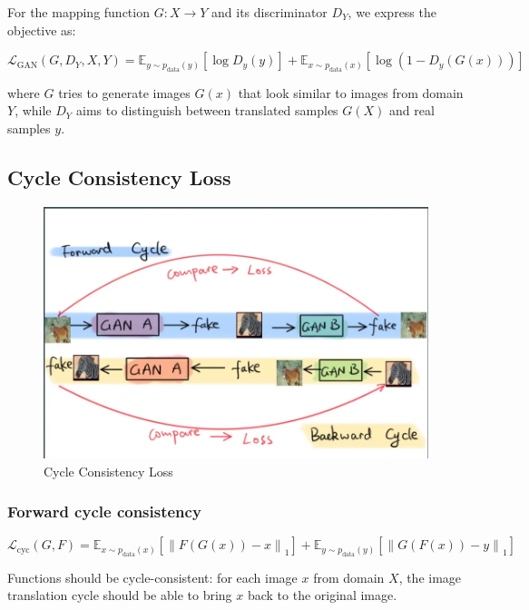 \documentclass[
]{article}
\begin{document}
For the mapping function \(G:X \rightarrow Y\) and its discriminator \(D_Y\),
we express the objective as:

\[\mathcal{L}_{\text{GAN}}(G,D_Y,X,Y)=\mathbb{E}_{y\sim p_{\text{data}}(y)}[\log{D_y(y)}]+\mathbb{E}_{x\sim p_{\text{data}}(x)}[\log{(1-D_y(G(x)))}]\]

where \(G\) tries to generate images \(G(x)\) that look similar to
images from domain \(Y\), while \(D_Y\) aims to distinguish between
translated samples \(G(X)\) and real samples \(y\).

\hypertarget{cycle-consistency-loss}{%
\subsection{Cycle Consistency Loss}\label{cycle-consistency-loss}}

\begin{figure}
\centering
\includegraphics{./assets/cycle_consistency_loss.png}
\caption{Cycle Consistency Loss}
\end{figure}

\hypertarget{forward-cycle-consistency}{%
\subsubsection{Forward cycle
consistency}\label{forward-cycle-consistency}}

\[\mathcal{L}_{\text{cyc}}(G,F)=\mathbb{E}_{x\sim p_{\text{data}}(x)}[\left\|F(G(x))-x\right\|_1]+\mathbb{E}_{y\sim p_{\text{data}}(y)}[\left\|G(F(x))-y\right\|_1]\]

Functions should be cycle-consistent: for each image \(x\) from domain
\(X\), the image translation cycle should be able to bring \(x\) back to
the original image.
\end{document}
